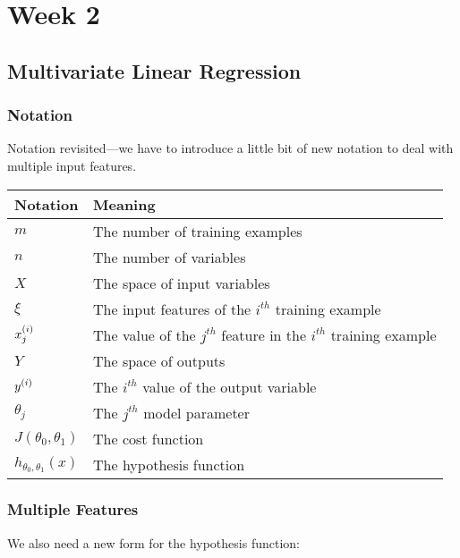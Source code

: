 \chapter{Week 2}

\section{Multivariate Linear Regression}

\subsection{Notation}

Notation revisited---we have to introduce a little bit of 
new notation to deal with multiple input features.

\begin{center}
  \begin{tabular}{l l}
    \hline
    Notation                    & Meaning \\
    \hline
    $m$                         & The number of training examples \\
    $n$                         & The number of variables \\
    $X$                         & The space of input variables \\
    $\xi$                       & The input features of the $i^{th}$ training example \\
    $x_{j}^{(i)}$                      & The value of the $j^{th}$ feature in the $i^{th}$ training example \\
    $Y$                         & The space of outputs \\
    $y_{}^{(i)}$                       & The $i^{th}$ value of the output variable \\
    $\theta_j$                  & The $j^{th}$ model parameter \\
    $J(\theta_0, \theta_1)$     & The cost function \\
    $h_{\theta_0, \theta_1}(x)$ & The hypothesis function \\
    \hline
  \end{tabular}
\end{center}

\subsection{Multiple Features}

We also need a new form for the hypothesis function:

